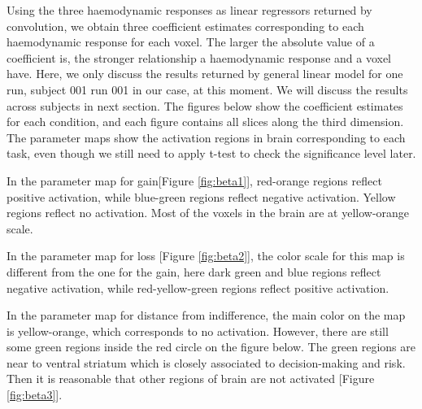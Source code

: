 \par \indent Using the three haemodynamic responses as linear regressors 
returned by convolution, we obtain three coefficient estimates corresponding 
to each haemodynamic response for each voxel. The larger the absolute value of a
coefficient is, the stronger relationship a haemodynamic response and a voxel
have. Here, we only discuss the results returned by general linear model for one
run, subject 001 run 001 in our case, at this moment. We will discuss the
results across subjects in next section. The figures below show the 
coefficient estimates for each condition, and each figure contains all slices 
along the third dimension. The parameter maps show the activation regions in 
brain corresponding to each task, even though we still need to apply t-test to 
check the significance level later.

\par \indent In the parameter map for gain[Figure \ref{fig:beta1}], red-orange 
regions reflect positive activation, while blue-green regions reflect negative 
activation. Yellow regions reflect no activation. Most of the voxels in the 
brain are at yellow-orange scale.

\par \indent In the parameter map for loss [Figure \ref{fig:beta2}],  the color 
scale for this map is different from the one for the gain, here dark green and 
blue regions reflect negative activation, while red-yellow-green regions 
reflect positive activation. 

\par \indent In the parameter map for distance from indifference, the main 
color on the map is yellow-orange, which corresponds to no activation. However, 
there are still some green regions inside the red circle on the figure below. 
The green regions are near to ventral striatum which is closely associated to 
decision-making and risk. Then it is reasonable that other regions of brain 
are not activated [Figure \ref{fig:beta3}].

